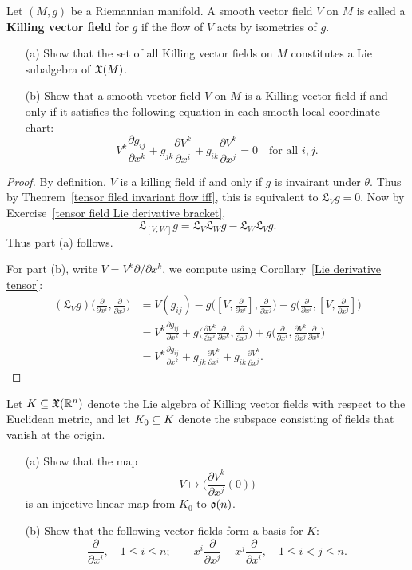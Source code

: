 \begin{exercise}
Let $(M,g)$ be a Riemannian manifold. A smooth vector field $V$ on $M$ is called a \textbf{Killing vector field} for $g$ if the flow of $V$ acts by isometries of $g$.
\begin{itemize}
\item[(a)] Show that the set of all Killing vector fields on $M$ constitutes a Lie subalgebra of $\mathfrak{X}(M)$.
\item[(b)] Show that a smooth vector field $V$ on $M$ is a Killing vector field if and only if it satisfies the following equation in each smooth local coordinate chart:
\[V^k\frac{\partial g_{ij}}{\partial x^k}+g_{jk}\frac{\partial V^k}{\partial x^i}+g_{ik}\frac{\partial V^k}{\partial x^j}=0\quad\text{for all }i,j.\]
\end{itemize}
\end{exercise}
\begin{proof}
By definition, $V$ is a killing field if and only if $g$ is invairant under $\theta$. Thus by Theorem~\ref{tensor filed invariant flow iff}, this is equivalent to $\mathfrak{L}_Vg=0$. Now by Exercise~\ref{tensor field Lie derivative bracket},
\[\mathfrak{L}_{[V,W]}g=\mathfrak{L}_V\mathfrak{L}_Wg-\mathfrak{L}_W\mathfrak{L}_Vg.\]
Thus part (a) follows.\par
For part (b), write $V=V^k\partial/\partial x^k$, we compute using Corollary~\ref{Lie derivative tensor}:
\begin{align*}
(\mathfrak{L}_Vg)\Big(\frac{\partial}{\partial x^i},\frac{\partial}{\partial x^j}\Big)&=V(g_{ij})-g\Big([V,\frac{\partial}{\partial x^i}],\frac{\partial}{\partial x^j}\Big)-g\Big(\frac{\partial}{\partial x^i},[V,\frac{\partial}{\partial x^j}]\Big)\\
&=V^k\frac{\partial g_{ij}}{\partial x^k}+g\Big(\frac{\partial V^k}{\partial x^i}\frac{\partial}{\partial x^k},\frac{\partial}{\partial x^j}\Big)+g\Big(\frac{\partial}{\partial x^i},\frac{\partial V^k}{\partial x^j}\frac{\partial}{\partial x^k}\Big)\\
&=V^k\frac{\partial g_{ij}}{\partial x^k}+g_{jk}\frac{\partial V^k}{\partial x^i}+g_{ik}\frac{\partial V^k}{\partial x^j}.
\end{align*}
\end{proof}
\begin{exercise}
Let $K\subseteq\mathfrak{X}(\mathbb{R}^n)$ denote the Lie algebra of Killing vector fields with respect to the Euclidean metric, and let $K_0\subseteq K$ denote the
subspace consisting of fields that vanish at the origin.
\begin{itemize}
\item[(a)] Show that the map
\[V\mapsto\Big(\frac{\partial V^k}{\partial x^j}(0)\Big)\]
is an injective linear map from $K_0$ to $\mathfrak{o}(n)$.
\item[(b)] Show that the following vector fields form a basis for $K$:
\[\frac{\partial}{\partial x^i},\quad 1\leq i\leq n;\quad\quad x^i\frac{\partial}{\partial x^j}-x^j\frac{\partial}{\partial x^i},\quad 1\leq i<j\leq n.\]
\end{itemize}
\end{exercise}
